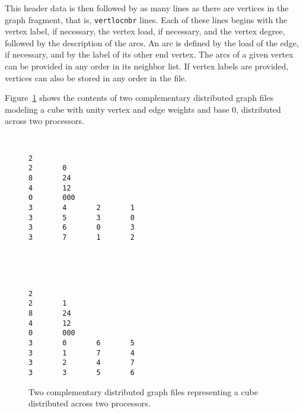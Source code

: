 This header data is then followed by as many lines as there are
vertices in the graph fragment, that is, {\tt vert\lbo loc\lbo nbr}
lines. Each of these lines begins with the vertex label, if necessary,
the vertex load, if necessary, and the vertex degree, followed by the
description of the arcs. An arc is defined by the load of the edge, if
necessary, and by the label of its other end vertex.
The arcs of a given vertex can be provided in any order in its
neighbor list. If vertex labels are provided, vertices can also be
stored in any order in the file.

Figure~\ref{fig-file-dsgraph} shows the contents of two complementary
distributed graph files modeling a cube with unity vertex and edge
weights and base $0$, distributed across two processors.

\begin{figure}[hbt]
\begin{center}
\begin{minipage}{4.0cm}
{\renewcommand{\baselinestretch}{1.05}
 \footnotesize \tt
\begin{verbatim}
2
2       0
8       24
4       12
0       000
3       4       2       1
3       5       3       0
3       6       0       3
3       7       1       2
\end{verbatim}}
\end{minipage}
\hfil~\hfil
\begin{minipage}{4.0cm}
{\renewcommand{\baselinestretch}{1.05}
 \footnotesize \tt
\begin{verbatim}
2
2       1
8       24
4       12
0       000
3       0       6       5
3       1       7       4
3       2       4       7
3       3       5       6
\end{verbatim}}
\end{minipage}
\end{center}
\caption{Two complementary distributed graph files representing
a cube distributed across two processors.}
\label{fig-file-dsgraph}
\end{figure}
